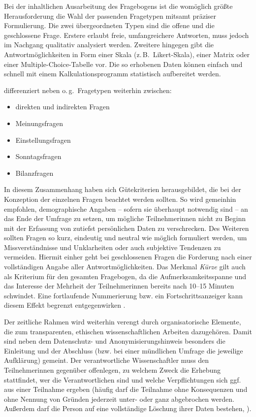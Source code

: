Bei der inhaltlichen Ausarbeitung des Fragebogens ist die womöglich größte Herausforderung die Wahl der passenden Fragetypen mitsamt präziser Formulierung. Die zwei übergeordneten Typen sind die offene und die geschlossene Frage. Erstere erlaubt freie, umfangreichere Antworten, muss jedoch im Nachgang qualitativ analysiert werden. Zweitere hingegen gibt die Antwortmöglichkeiten in Form einer Skala (z.\,B.\ Likert-Skala), einer Matrix oder einer Multiple-Choice-Tabelle vor. Die so erhobenen Daten können einfach und schnell mit einem Kalkulationsprogramm statistisch aufbereitet werden.

\citet[139\psqq]{atteslander_methoden_2010} differenziert neben o.\,g.\ Fragetypen weiterhin zwischen:
\begin{itemize}
    \item direkten und indirekten Fragen
    \item Meinungsfragen
    \item Einstellungsfragen
    \item Sonntagsfragen
    \item Bilanzfragen
\end{itemize}

In diesem Zusammenhang haben sich Gütekriterien herausgebildet, die bei der Konzeption der einzelnen Fragen beachtet werden sollten. So wird gemeinhin empfohlen, demographische Angaben -- sofern sie überhaupt notwendig sind -- an das Ende der Umfrage zu setzen, um mögliche Teilnehmer{\textperiodcentered}innen nicht zu Beginn mit der Erfassung von zutiefst persönlichen Daten zu verschrecken. Des Weiteren sollten Fragen so kurz, eindeutig und neutral wie möglich formuliert werden, um Missverständnisse und Unklarheiten oder auch subjektive Tendenzen zu vermeiden. Hiermit einher geht bei geschlossenen Fragen die Forderung nach einer vollständigen Angabe aller Antwortmöglichkeiten. Das Merkmal \emph{Kürze} gilt auch als Kriterium für den gesamten Fragebogen, da die Aufmerksamkeitsspanne und das Interesse der Mehrheit der Teilnehmer{\textperiodcentered}innen bereits nach 10--15 Minuten schwindet. Eine fortlaufende Nummerierung bzw. ein Fortschrittsanzeiger kann diesem Effekt begrenzt entgegenwirken \citep[170]{aeppli_empirisches_2016}.

Der zeitliche Rahmen wird weiterhin verengt durch organisatorische Elemente, die zum transparenten, ethischen wissenschaftlichen Arbeiten dazugehören. Damit sind neben dem Datenschutz- und Anonymisierungshinweis besonders die Einleitung und der Abschluss (bzw. bei einer mündlichen Umfrage die jeweilige Aufklärung) gemeint. Der verantwortliche Wissenschaftler muss den Teilnehmer{\textperiodcentered}innen gegenüber offenlegen, zu welchem Zweck die Erhebung stattfindet, wer die Verantwortlichen sind und welche Verpflichtungen sich ggf. aus einer Teilnahme ergeben (häufig darf die Teilnahme ohne Konsequenzen und ohne Nennung von Gründen jederzeit unter- oder ganz abgebrochen werden. Außerdem darf die Person auf eine vollständige Löschung ihrer Daten bestehen, \citealt[147]{atteslander_methoden_2010}). 


